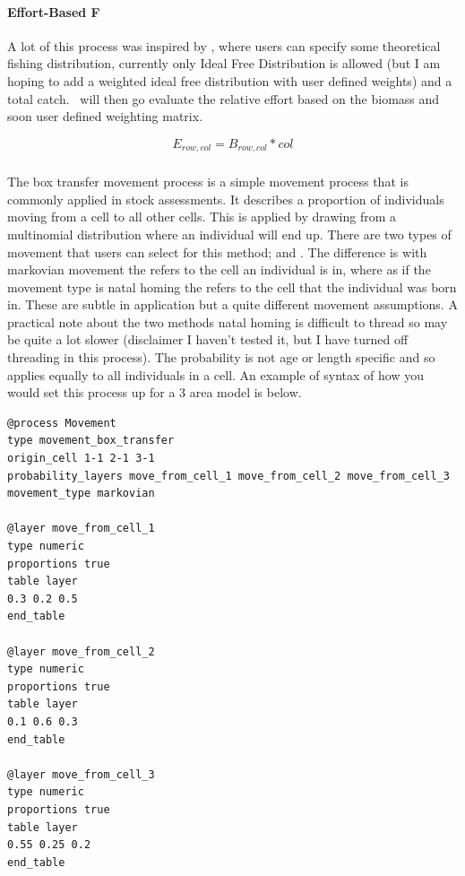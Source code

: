 \paragraph{Effort-Based F}\label{para:effort_based_F}
A lot of this process was inspired by \cite{truesdell2017effects}, where users can specify some theoretical fishing distribution, currently only Ideal Free Distribution is allowed (but I am hoping to add a weighted ideal free distribution with user defined weights) and a total catch. \IBM\ will then go evaluate the relative effort based on the biomass and soon user defined weighting matrix.

\begin{equation}
	E_{row,col} = B_{row,col} * col
\end{equation}

%



\subsubsection{}
\paragraph{}\label{subsubsec:box_transfer}
The box transfer movement process is a simple movement process that is commonly applied in stock assessments. It describes a proportion of individuals moving from a cell to all other cells. This is applied by drawing from a multinomial distribution where an individual will end up. There are two types of movement that users can select for this method;  and . The difference is with markovian movement the  refers to the cell an individual is in, where as if the movement type is natal homing the  refers to the cell that the individual was born in. These are subtle in application but a quite different movement assumptions. A practical note about the two methods natal homing is difficult to thread so may be quite a lot slower (disclaimer I haven't tested it, but I have turned off threading in this process). The probability is not age or length specific and so applies equally to all individuals in a cell. An example of syntax of how you would set this process up for a 3 area model is below.


{\small{\begin{verbatim}
@process Movement
type movement_box_transfer
origin_cell 1-1 2-1 3-1
probability_layers move_from_cell_1 move_from_cell_2 move_from_cell_3
movement_type markovian

@layer move_from_cell_1
type numeric
proportions true
table layer
0.3 0.2 0.5
end_table

@layer move_from_cell_2
type numeric
proportions true
table layer
0.1 0.6 0.3
end_table

@layer move_from_cell_3
type numeric
proportions true
table layer
0.55 0.25 0.2
end_table

\end{verbatim}}}

